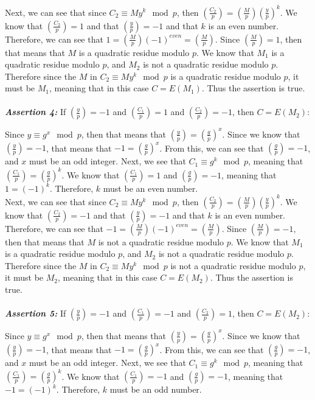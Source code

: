 \documentclass[11pt]{article}
\theoremstyle{definition}
\providecommand{\Leg}[2]{\genfrac{(}{)}{}{}{#1}{#2}}
\begin{document}
\begin{enumerate}
Next, we can see that since $C_2 \equiv My^k \mod{p}$, then $\Leg{C_2}{p} = \Leg{M}{p} \Leg{y}{p}^k$. We know that $\Leg{C_2}{p} = 1$ and that $\Leg{y}{p} = -1$ and that $k$ is an even number. Therefore, we can see that $1 = \Leg{M}{p} (-1)^{even} = \Leg{M}{p}$. Since $\Leg{M}{p} = 1$, then that means that $M$ is a quadratic residue modulo $p$. We know that $M_1$ is a quadratic residue modulo $p$, and $M_2$ is not a quadratic residue modulo $p$. Therefore since the $M$ in $C_2 \equiv My^k \mod{p}$ is a quadratic residue modulo $p$, it must be $M_1$, meaning that in this case $C = E(M_1)$. Thus the assertion is true. \\ \\


\textbf{\textit{Assertion 4:}} If $\Leg{y}{p} = -1$ and $\Leg{C_1}{p} = 1$ and $\Leg{C_2}{p} = -1$, then $C = E(M_2)$:

Since $y \equiv g^x \mod{p}$, then that means that $\Leg{y}{p} = \Leg{g}{p}^x$. Since we know that $\Leg{y}{p} = -1$, that means that $-1 = \Leg{g}{p}^x$. From this, we can see that $\Leg{g}{p} = -1$, and $x$ must be an odd integer. Next, we see that $C_1 \equiv g^k \mod{p}$, meaning that $\Leg{C_1}{p} = \Leg{g}{p}^k$. We know that $\Leg{C_1}{p} = 1$ and $\Leg{g}{p} = -1$, meaning that $1 = (-1)^k$. Therefore, $k$ must be an even number. \\

Next, we can see that since $C_2 \equiv My^k \mod{p}$, then $\Leg{C_2}{p} = \Leg{M}{p} \Leg{y}{p}^k$. We know that $\Leg{C_2}{p} = -1$ and that $\Leg{y}{p} = -1$ and that $k$ is an even number. Therefore, we can see that $-1 = \Leg{M}{p} (-1)^{even} = \Leg{M}{p}$. Since $\Leg{M}{p} = -1$, then that means that $M$ is not a quadratic residue modulo $p$. We know that $M_1$ is a quadratic residue modulo $p$, and $M_2$ is not a quadratic residue modulo $p$. Therefore since the $M$ in $C_2 \equiv My^k \mod{p}$ is not a quadratic residue modulo $p$, it must be $M_2$, meaning that in this case $C = E(M_2)$. Thus the assertion is true. \\ \\


\textbf{\textit{Assertion 5:}} If $\Leg{y}{p} = -1$ and $\Leg{C_1}{p} = -1$ and $\Leg{C_2}{p} = 1$, then $C = E(M_2)$:

Since $y \equiv g^x \mod{p}$, then that means that $\Leg{y}{p} = \Leg{g}{p}^x$. Since we know that $\Leg{y}{p} = -1$, that means that $-1 = \Leg{g}{p}^x$. From this, we can see that $\Leg{g}{p} = -1$, and $x$ must be an odd integer. Next, we see that $C_1 \equiv g^k \mod{p}$, meaning that $\Leg{C_1}{p} = \Leg{g}{p}^k$. We know that $\Leg{C_1}{p} = -1$ and $\Leg{g}{p} = -1$, meaning that $-1 = (-1)^k$. Therefore, $k$ must be an odd number. \\


\end{enumerate}
\end{document}
